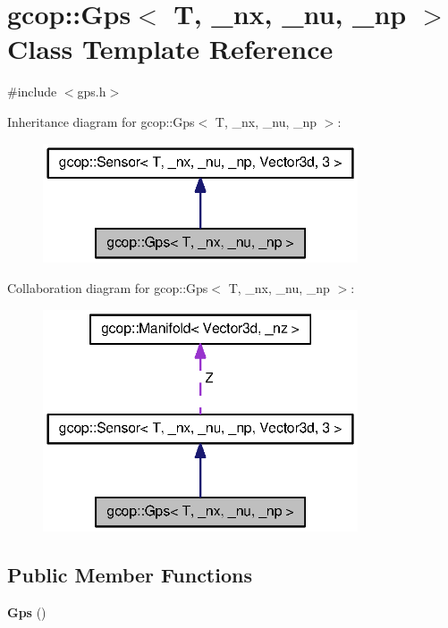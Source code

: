 \section{gcop\-:\-:\-Gps$<$ \-T, \-\_\-nx, \-\_\-nu, \-\_\-np $>$ \-Class \-Template \-Reference}
\label{classgcop_1_1Gps}


{\ttfamily \#include $<$gps.\-h$>$}



\-Inheritance diagram for gcop\-:\-:\-Gps$<$ \-T, \-\_\-nx, \-\_\-nu, \-\_\-np $>$\-:\nopagebreak
\begin{figure}[H]
\begin{center}
\leavevmode
\includegraphics[width=264pt]{classgcop_1_1Gps__inherit__graph}
\end{center}
\end{figure}


\-Collaboration diagram for gcop\-:\-:\-Gps$<$ \-T, \-\_\-nx, \-\_\-nu, \-\_\-np $>$\-:\nopagebreak
\begin{figure}[H]
\begin{center}
\leavevmode
\includegraphics[width=264pt]{classgcop_1_1Gps__coll__graph}
\end{center}
\end{figure}
\subsection*{\-Public \-Member \-Functions}
\begin{DoxyCompactItemize}
\item 
{\bf \-Gps} ()
\end{DoxyCompactItemize}


